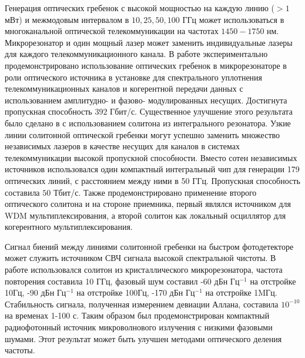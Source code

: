 Генерация оптических гребенок с высокой мощностью на каждую линию ($>1$ мВт) и межмодовым интервалом в $10,25,50,100$ ГГц может использоваться в многоканальной оптической телекоммуникации на частотах $1450-1750$ нм. Микрорезонатор и один мощный лазер может заменить индивидуальные лазеры для каждого телекоммуникационного канала. В работе \cite{Pfeifle2014} экспериментально продемонстрировано использование оптических гребенок в микрорезонаторе в роли оптического источника в установке для спектрального уплотнения телекоммуникационных каналов и когерентной передачи данных с использованием амплитудно- и фазово- модулированных несущих. Достигнута пропускная способность $392$ Гбит/с. Существенное улучшение этого результата было сделано в \cite{MarinPalomo2017} с использованием солитона из интегрального резонатора. Узкие линии солитонной оптической гребенки могут успешно заменить множество независимых лазеров в качестве несущих для каналов в системах телекоммуникации высокой пропускной способности. Вместо сотен независимых источников использовался один компактный интегральный чип для генерации 179 оптических линий, с расстоянием между ними в 50 ГГц. Пропускная способность составила $50$ Тбит/с. Также продемонстрировано применение второго оптического солитона и на стороне приемника, первый являлся источником для WDM мультиплексирования, а второй солитон как локальный осциллятор для когерентного мультиплексирования.

Сигнал биений между линиями солитонной гребенки на быстром фотодетекторе может служить источником СВЧ сигнала высокой спектральной чистоты. В работе \cite{Liang2015} использовался солитон из кристаллического микрорезонатора, частота повторения составила 10 ГГц, фазовый шум составил -60 дБн Гц$^{-1}$ на отстройке 10Гц, -90 дБн Гц$^{-1}$ на отстройке 100Гц, -170 дБн Гц$^{-1}$ на отстройке 1MГц. Стабильность сигнала, полученная измерением девиации Аллана, составила $10^{-10}$ на временах 1-100 с. Таким образом был продемонстрирован компактный радиофотонный источник микроволнового излучения с низкими фазовыми шумами. Этот результат может быть улучшен методами оптического деления частоты.

